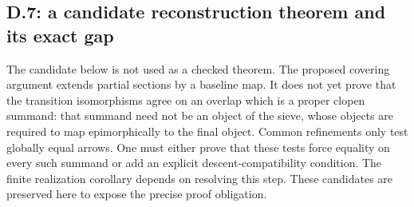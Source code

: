 \subsection{D.7: a candidate reconstruction theorem and its exact gap}
The candidate below is not used as a checked theorem. The proposed
covering argument extends partial sections by a baseline map. It does
not yet prove that the transition isomorphisms agree on an overlap
which is a proper clopen summand: that summand need not be an object
of the sieve, whose objects are required to map epimorphically to the
final object. Common refinements only test globally equal arrows.
One must either prove that these tests force equality on every such
summand or add an explicit descent-compatibility condition. The finite
realization corollary depends on resolving this step. These candidates
are preserved here to expose the precise proof obligation.

